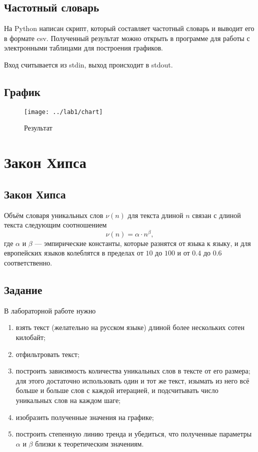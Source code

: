 \section{Частотный словарь}
На Python написан скрипт, который составляет частотный словарь
и выводит его в формате csv.
Полученный результат можно открыть в программе для работы
с электронными таблицами для построения графиков.

Вход считывается из stdin, выход происходит в stdout.

\lstset{inputencoding=utf8, extendedchars=\true}


\section{График}
\begin{figure}[h]
  \centering
  \texttt{[image: ../lab1/chart]}
  \caption{Результат}
\end{figure}

\chapter{Закон Хипса}

\section{Закон Хипса}
Объём словаря уникальных слов $\nu\left( n \right)$
для текста длиной $n$ связан с длиной текста следующим соотношением
\cite{Internetika}
\begin{equation*}
  \nu\left( n \right) = \alpha \cdot n^\beta,
\end{equation*}
где $\alpha$ и $\beta$ --- эмпирические константы,
которые разнятся от языка к языку,
и для европейских языков колеблятся в пределах
от $10$ до $100$ и от $0.4$ до $0.6$ соответственно.

\section{Задание}
В лабораторной работе нужно
\begin{enumerate}
  \item
    взять текст (желательно на русском языке)
    длиной более нескольких сотен килобайт;
  \item
    отфильтровать текст;
  \item
    построить зависимость количества уникальных слов в тексте
    от его размера; для этого достаточно использовать один и тот же текст,
    изымать из него всё больше и больше слов с каждой итерацией,
    и подсчитывать число уникальных слов на каждом шаге;
  \item
    изобразить полученные значения на графике;
  \item
    построить степенную линию тренда и убедиться,
    что полученные параметры $\alpha$ и $\beta$ близки к
    теоретическим значениям.
\end{enumerate}

